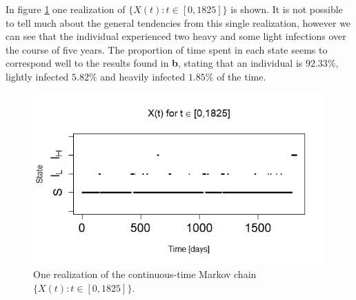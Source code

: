 In figure \ref{1realiz5yr} one realization of $\{X(t): t \in [0,1825]\}$ is shown. It is not possible to tell much about the general tendencies from this single realization, however we can see that the individual experienced two heavy and some light infections over the course of five years. The proportion of time spent in each state seems to correspond well to the results found in \textbf{b}, stating that an individual is  $92.33\%$, lightly infected $5.82\%$ and heavily infected $1.85\%$ of the time. 

\begin{figure}
    \centering
    \includegraphics[width=130mm]{1real5yr.png}
    \caption{One realization of the continuous-time Markov chain $\{X(t):t \in [0, 1825]\}$.}
    \label{1realiz5yr}
\end{figure}

